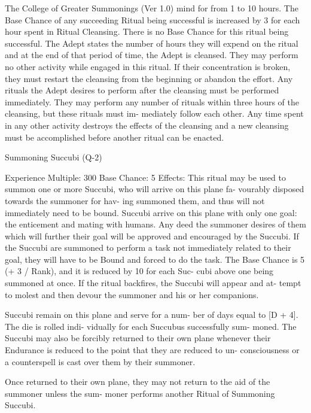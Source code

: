 \begin{Chapter}{The College of Greater Summonings (Ver 1.0)}
mind  for  from 1  to 10  hours.  The  Base  Chance  of 
any succeeding Ritual being successful is increased 
by 3 for each hour spent in Ritual Cleansing. There 
is  no  Base  Chance  for  this  ritual  being  successful. 
The  Adept  states  the  number  of  hours  they  will 
expend on the ritual and at the end of that period of 
time, the Adept is cleansed. They may perform no 
other  activity  while  engaged  in  this  ritual.  If  their 
concentration  is  broken,  they  must  restart  the 
cleansing from the beginning or abandon the effort. 
Any  rituals  the  Adept  desires  to  perform  after  the 
cleansing  must  be  performed  immediately.  They 
may  perform  any  number  of  rituals  within  three 
hours  of  the  cleansing,  but  these  rituals  must  im-
mediately follow each other. Any time spent in any 
other  activity  destroys  the  effects  of  the  cleansing 
and  a new  cleansing  must be  accomplished  before 
another ritual can be enacted. 

Summoning Succubi (Q-2) 

Experience Multiple: 300 
Base Chance: 5%
Effects: This ritual may be used to summon one or 
more  Succubi,  who  will  arrive  on  this  plane  fa-
vourably  disposed  towards  the  summoner  for  hav-
ing summoned them, and thus will not immediately 
need to be bound. Succubi arrive on this plane with 
only  one  goal:  the  enticement  and  mating  with 
humans.  Any  deed  the  summoner  desires  of  them 
which  will  further  their  goal  will  be  approved  and 
encouraged  by  the  Succubi.  If  the  Succubi  are 
summoned  to  perform  a  task  not  immediately 
related  to  their  goal,  they  will  have  to  be  Bound 
and forced to do the task. The Base Chance is 5%
(+ 3 / Rank), and it is reduced by 10 for each Suc-
cubi  above  one  being  summoned  at  once.  If  the 
ritual  backfires,  the  Succubi  will  appear  and  at-
tempt to molest and then devour the summoner and 
his or her companions. 

Succubi remain on this plane and serve for a num-
ber of days equal to [D + 4]. The die is rolled indi-
vidually  for  each  Succubus  successfully  sum-
moned. The Succubi may also be forcibly returned 
to  their  own  plane  whenever  their  Endurance  is 
reduced  to  the  point  that  they  are  reduced  to  un-
consciousness  or  a  counterspell  is  cast  over  them 
by their summoner. 

Once  returned  to  their  own  plane,  they  may  not 
return to  the  aid  of the  summoner  unless the  sum-
moner  performs  another  Ritual  of  Summoning 
Succubi. 


\end{Chapter}

